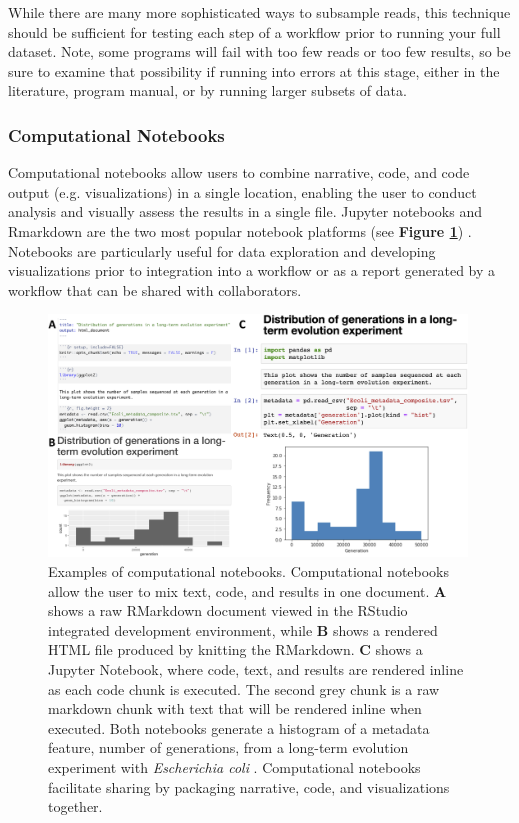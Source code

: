 \documentclass[10pt,letterpaper]{article}
\begin{document}
While there are many more sophisticated ways to subsample reads, this technique should be sufficient for testing each step of a workflow prior to running your full dataset. 
Note, some programs will fail with too few reads or too few results, so be sure to examine that possibility if running into errors at this stage, either in the literature, program manual, or by running larger subsets of data.

\subsubsection*{Computational Notebooks} 

Computational notebooks allow users to combine narrative, code, and code output (e.g. visualizations) in a single location, enabling the user to conduct analysis and visually assess the results in a single file.
Jupyter notebooks and Rmarkdown are the two most popular notebook platforms (see \textbf{Figure \ref{fig:nb_figure}}) \cite{kluyver2016jupyter, allaire2018rmarkdown}. 
Notebooks are particularly useful for data exploration and developing visualizations prior to integration into a workflow or as a report generated by a workflow that can be shared with collaborators. 

\begin{figure}
\includegraphics[width=0.99\textwidth]{figures/nb_figure.png}
\caption{Examples of computational notebooks. Computational notebooks allow the user to mix text, code, and results in one document. \textbf{A} shows a raw RMarkdown document viewed in the RStudio integrated development environment, while \textbf{B} shows a rendered HTML file produced by knitting the RMarkdown. \textbf{C} shows a Jupyter Notebook, where code, text, and results are rendered inline as each code chunk is executed. The second grey chunk is a raw markdown chunk with text that will be rendered inline when executed. Both notebooks generate a histogram of a metadata feature, number of generations, from a long-term evolution experiment with \textit{Escherichia coli} \cite{tenaillon2016tempo}. Computational notebooks facilitate sharing by packaging narrative, code, and visualizations together.} 
\label{fig:nb_figure}
\end{figure}
\end{document}
